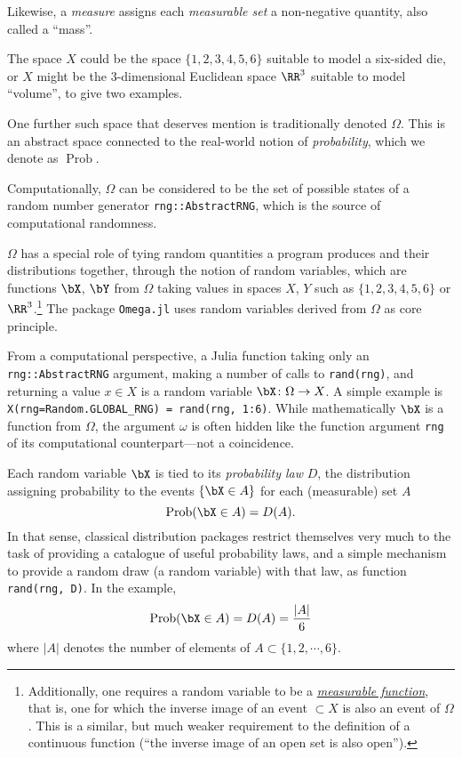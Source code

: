 \documentclass{juliacon}
\begin{document}
Likewise, a \emph{measure} assigns each \emph{measurable set} a non-negative quantity, also called a ``mass''.

The space $X$ could be the space $\{1,2,3,4,5,6\}$ suitable to model a six-sided die, or $X$ might be the 3-dimensional Euclidean space $\RR^3$ suitable to model ``volume'', to give two examples.

One further such space that deserves mention is traditionally denoted $\Omega$. This is an abstract space connected to the real-world notion of \emph{probability}, which we denote as $\operatorname{Prob}$.

Computationally, $\Omega$ can be considered to be the set of possible states of a random number generator \verb|rng::AbstractRNG|, which is the source of computational randomness.

$\Omega$ has a special role of tying random quantities a program produces and their
distributions together, through the notion of random variables, which are
functions $\bX$, $\bY$ from $\Omega$ taking values in spaces $X$, $Y$ such as
$\{1,2,3,4,5,6\}$ or $\RR^3$.\footnote{Additionally, one requires a random
variable to be a \href{https://en.wikipedia.org/wiki/Measurable_function}{\emph{measurable
function}}, that is, one for which the inverse image of an event $\subset X$ is
also an event of $\Omega$.
This is a similar, but much weaker requirement to the definition of a continuous function (``the inverse image of an open set is also open'').}
The package \verb|Omega.jl| \cite{tavares2019language} uses random variables
derived from $\Omega$ as  core principle. 

From a computational perspective,
a Julia function taking only an \verb|rng::AbstractRNG| argument, making a number of calls to \verb|rand(rng)|, and returning a value $x\in X$ is a random variable $\bX \colon \Omega\to X$.
A simple example is  \verb|X(rng=Random.GLOBAL_RNG) = rand(rng, 1:6)|.
While mathematically $\bX$ is a function from $\Omega$, the argument $\omega$ is often hidden like the function argument \verb|rng| of its computational counterpart---not a coincidence.


Each random variable $\bX$ is tied to its \emph{probability law} $D$, the distribution assigning probability to the events $\{\bX \in A\}$ for each (measurable) set $A$
\[\operatorname{Prob}(\bX \in A) = D(A).
\]
In that sense, classical distribution packages restrict themselves very much to the task of providing a catalogue of useful probability laws, and a simple mechanism to provide a random draw (a random variable) with that law, as function
\verb|rand(rng, D)|.
In the example, 
\[\operatorname{Prob}(\bX \in A) = D(A) =  \dfrac{|A|}{6}\]
where $|A|$ denotes the number of elements of $A \subset \{1,2,\cdots,6\}$.
\end{document}
